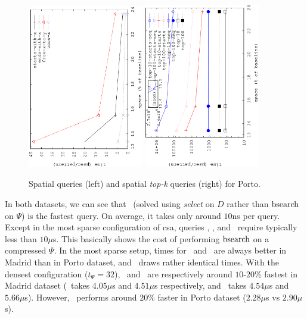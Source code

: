 \begin{figure}[htb]
		\begin{center}
			{\includegraphics[angle=-90,width=0.45\textwidth]{figures_synt/porto_spatial.eps}}
			{\includegraphics[angle=-90,width=0.45\textwidth]{figures_synt/porto_spatial_topk.eps}}
		\end{center}
		\vspace{-0.3cm}
		\caption{Spatial queries (left) and spatial {\em top-k} queries (right) for Porto.}
		\label{fig:portosp}
	\end{figure}

	In both datasets, we can see that \loadX\ (solved using {\em select} on $D$ rather than
	$\operatorname{bsearch}$ on $\Psi$) is the fastest query. On average, it takes only around $10$ns
	per query. Except in the most sparse configuration of \gls{csa}, queries \endX, \startX, and 
	\XtoY\ require typically less than $10\mu$s. This basically shows the cost of performing
	$\operatorname{bsearch}$ on a compressed $\Psi$. In the most sparse setup, times for \startX\ and \XtoY\ are always better 
	in Madrid than in Porto dataset, and \endX\ draws rather identical times.
	With the densest configuration  ($t_{\Psi}=32$), \endX\ and \XtoY\ are respectively 
	around $10$-$20$\% fastest in Madrid dataset (\endX\ takes $4.05\mu$s and $4.51\mu$s respectively, and
	\XtoY\ takes $4.54\mu$s and $5.66\mu$s). However, \startX\ performs around $20$\% faster in Porto dataset 
	($2.28\mu$s vs $2.90\mu$s).
	\medskip

